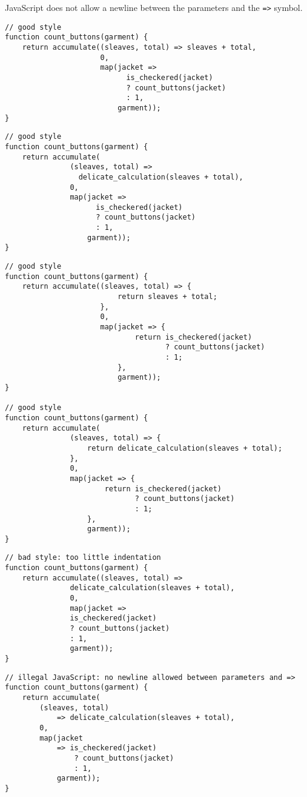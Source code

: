 JavaScript does not allow a newline between the parameters and the \lstinline{=>}
symbol.
\begin{lstlisting}
// good style
function count_buttons(garment) {
    return accumulate((sleaves, total) => sleaves + total,
                      0, 
                      map(jacket =>
                            is_checkered(jacket)
                            ? count_buttons(jacket)
                            : 1,
                          garment));
}
\end{lstlisting}
\begin{lstlisting}
// good style
function count_buttons(garment) {
    return accumulate(
               (sleaves, total) =>
                 delicate_calculation(sleaves + total),
               0,
               map(jacket =>
                     is_checkered(jacket)
                     ? count_buttons(jacket)
                     : 1,
                   garment));
}
\end{lstlisting}
\newpage
\begin{lstlisting}
// good style
function count_buttons(garment) {
    return accumulate((sleaves, total) => {
                          return sleaves + total;
                      },
                      0, 
                      map(jacket => {
                              return is_checkered(jacket)
                                     ? count_buttons(jacket)
                                     : 1;
                          },
                          garment));
}

// good style
function count_buttons(garment) {
    return accumulate(
               (sleaves, total) => {
                   return delicate_calculation(sleaves + total);
               },
               0,
               map(jacket => {
                       return is_checkered(jacket)
                              ? count_buttons(jacket)
                              : 1;
                   },
                   garment));
}
\end{lstlisting}
\begin{lstlisting}
// bad style: too little indentation
function count_buttons(garment) {
    return accumulate((sleaves, total) =>
               delicate_calculation(sleaves + total),
               0, 
               map(jacket =>
               is_checkered(jacket)
               ? count_buttons(jacket)
               : 1,
               garment));
}
\end{lstlisting}
\begin{lstlisting}
// illegal JavaScript: no newline allowed between parameters and =>
function count_buttons(garment) {
    return accumulate(
        (sleaves, total) 
            => delicate_calculation(sleaves + total),
        0,
        map(jacket 
            => is_checkered(jacket)
                ? count_buttons(jacket)
                : 1,
            garment));
}
\end{lstlisting}

